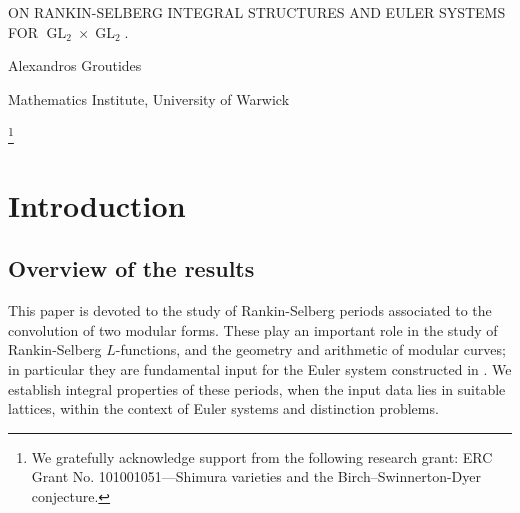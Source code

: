 \documentclass{amsart}%
\date{} %
\theoremstyle{plain}
\theoremstyle{plain}
\theoremstyle{remark}
\DeclareMathOperator{\GL}{GL}
\newcommand\blfootnote[1]{%
  \begingroup
  \renewcommand\thefootnote{}\footnote{#1}%
  \addtocounter{footnote}{-1}%
  \endgroup
}
\begin{document}
\hypersetup{citecolor=blue}
\hypersetup{linkcolor=red}

\begin{center}
  \LARGE 
 ON RANKIN-SELBERG INTEGRAL STRUCTURES AND EULER SYSTEMS FOR $\GL_2\times \GL_2.$
 
  \normalsize
  \bigskip
  Alexandros Groutides \par 
  
 Mathematics Institute, University of Warwick\par
\end{center}


\begin{abstract}
   We study how Rankin-Selberg periods and distinction problems interact with integral structures in spherical Whittaker type representations. Using this representation-theoretic framework, we settle a conjecture of Loeffler by showing that the local Euler factors appearing in the construction of the motivic Rankin-Selberg Euler system for a product of modular forms are integrally optimal; i.e. any construction of this type with any choice of integral input data in the recipe of Loeffler-Skinner-Zerbes, would give local factors appearing in tame norm relations at $p$, which are integrally divisible by the Euler factor $\mathcal{P}_p^{'}(\mathrm{Frob}_p^{-1})$ modulo $p-1$. We also interpret this as an integrality result on the unramified part of the period associated to the Rankin-Selberg convolution of two modular forms.
\end{abstract}
\blfootnote{We gratefully acknowledge support from the following research grant: ERC Grant No. 101001051—Shimura varieties and the Birch–Swinnerton-Dyer conjecture.}
\vspace{-2em}
\section{Introduction} 
\subsection{Overview of the results}
This paper is devoted to the study of Rankin-Selberg periods associated to the convolution of two modular forms. These play an important role in the study of Rankin-Selberg $L$-functions, and the geometry and arithmetic of modular curves; in particular they are fundamental input for the Euler system constructed in \cite{Lei_2014}. We establish integral properties of these periods, when the input data lies in suitable lattices, within the context of Euler systems and distinction problems.
\end{document}
